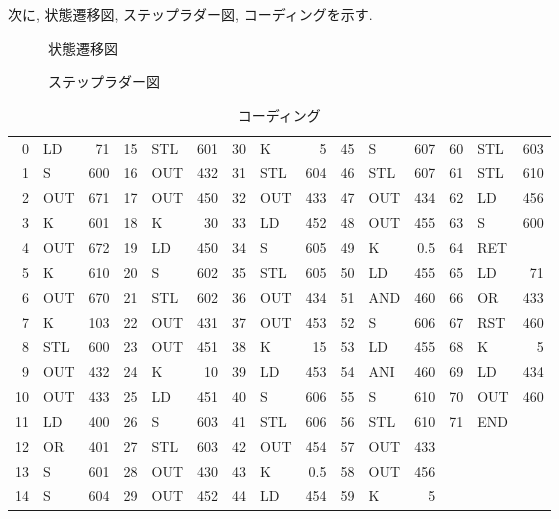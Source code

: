 \documentclass[titlepage]{jsarticle}
\begin{document}
    次に, 状態遷移図, ステップラダー図, コーディングを示す.
    \begin{figure}[h]
      \centering
      \caption{状態遷移図}
    \end{figure}
    \begin{figure}[h]
      \centering
      \caption{ステップラダー図}
    \end{figure}
    \begin{table}[h]
      \caption{コーディング}
      \label{tab:sig_code}
      \centering
      \begin{tabular}{r|lr||r|lr||r|lr||r|lr||r|lr}
        0 &  LD &  71 &  15 & STL & 601 & 30 & K &   5 &   45 & S &   607 & 60 & STL & 603 \\
        1 &  S &   600 & 16 & OUT & 432 & 31 & STL & 604 & 46 & STL & 607 & 61 & STL & 610 \\
        2 &  OUT & 671 & 17 & OUT & 450 & 32 & OUT & 433 & 47 & OUT & 434 & 62 & LD &  456 \\
        3 &  K &   601 & 18 & K &   30 &  33 & LD &  452 & 48 & OUT & 455 & 63 & S &   600 \\
        4 &  OUT & 672 & 19 & LD &  450 & 34 & S &   605 & 49 & K &   0.5 & 64 & RET & \\
        5 &  K &   610 & 20 & S &   602 & 35 & STL & 605 & 50 & LD &  455 & 65 & LD &  71 \\
        6 &  OUT & 670 & 21 & STL & 602 & 36 & OUT & 434 & 51 & AND & 460 & 66 & OR &  433 \\
        7 &  K &   103 & 22 & OUT & 431 & 37 & OUT & 453 & 52 & S &   606 & 67 & RST & 460 \\
        8 &  STL & 600 & 23 & OUT & 451 & 38 & K &   15 &  53 & LD &  455 & 68 & K &   5 \\
        9 &  OUT & 432 & 24 & K &   10 &  39 & LD &  453 & 54 & ANI & 460 & 69 & LD &  434 \\
        10 & OUT & 433 & 25 & LD &  451 & 40 & S &   606 & 55 & S &   610 & 70 & OUT & 460 \\
        11 & LD &  400 & 26 & S &   603 & 41 & STL & 606 & 56 & STL & 610 & 71 & END & \\
        12 & OR &  401 & 27 & STL & 603 & 42 & OUT & 454 & 57 & OUT & 433 & & & \\
        13 & S &   601 & 28 & OUT & 430 & 43 & K &   0.5 & 58 & OUT & 456 & & & \\
        14 & S &   604 & 29 & OUT & 452 & 44 & LD &  454 & 59 & K &   5 & & & \\
      \end{tabular}
    \end{table}
\end{document}

